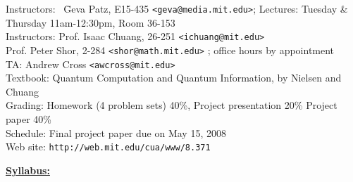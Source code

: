 \documentclass[preprint,pra,12pt]{ikedoc3}
\begin{document}
\begin{tabbing}
Instructors:~ \= Geva Patz, E15-435 {\tt <geva@media.mit.edu>}; \kill
Lectures: \> Tuesday \& Thursday 11am-12:30pm, Room 36-153 \\
Instructors: \> Prof. Isaac Chuang, 26-251 {\tt <ichuang@mit.edu>} \\
             \> Prof. Peter Shor, 2-284 {\tt <shor@math.mit.edu>} ;
	office hours by appointment
\\
TA: \>  Andrew Cross {\tt <awcross@mit.edu>}\\
Textbook: \> Quantum Computation and Quantum Information, by Nielsen and Chuang
\\
Grading: \> Homework (4 problem sets) 40\%, Project presentation 20\%
	    Project paper 40\% 
\\
Schedule: \> Final project paper due on May 15, 2008
\\
Web site: \> {\tt http://web.mit.edu/cua/www/8.371}
\end{tabbing}

\vspace*{0.5cm}

{\noindent\bf \underline{Syllabus:}} 
\end{document}
